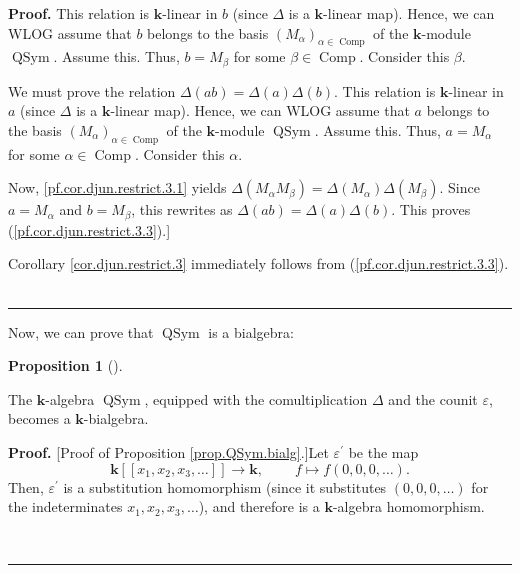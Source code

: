 \documentclass[numbers=enddot,12pt,final,onecolumn,notitlepage,abstracton]{scrartcl}
\theoremstyle{definition}
\newtheorem{prop}[theo]{Proposition}
\newenvironment{proposition}[1][]
{\begin{prop}[#1]\begin{leftbar}}
{\end{leftbar}\end{prop}}
\newenvironment{proof}[1][Proof]{\noindent\textbf{#1.} }{\ \rule{0.5em}{0.5em}}
\newenvironment{verlong}{}{}
\begin{document}
\begin{verlong}
\begin{footnotesize}
\begin{proof}
This relation is $\mathbf{k}$-linear in $b$ (since $\Delta$ is a $\mathbf{k}%
$-linear map). Hence, we can WLOG assume that $b$ belongs to the basis
$\left(  M_{\alpha}\right)  _{\alpha\in\operatorname*{Comp}}$ of the
$\mathbf{k}$-module $\operatorname*{QSym}$. Assume this. Thus, $b=M_{\beta}$
for some $\beta\in\operatorname*{Comp}$. Consider this $\beta$.

We must prove the relation $\Delta\left(  ab\right)  =\Delta\left(  a\right)
\Delta\left(  b\right)  $. This relation is $\mathbf{k}$-linear in $a$ (since
$\Delta$ is a $\mathbf{k}$-linear map). Hence, we can WLOG assume that $a$
belongs to the basis $\left(  M_{\alpha}\right)  _{\alpha\in
\operatorname*{Comp}}$ of the $\mathbf{k}$-module $\operatorname*{QSym}$.
Assume this. Thus, $a=M_{\alpha}$ for some $\alpha\in\operatorname*{Comp}$.
Consider this $\alpha$.

Now, \eqref{pf.cor.djun.restrict.3.1} yields $\Delta\left(  M_{\alpha}%
M_{\beta}\right)  =\Delta\left(  M_{\alpha}\right)  \Delta\left(  M_{\beta
}\right)  $. Since $a = M_{\alpha}$ and $b = M_{\beta}$, this rewrites as
$\Delta\left(  ab \right)  = \Delta\left(  a \right)  \Delta\left(  b \right)
$. This proves (\ref{pf.cor.djun.restrict.3.3}).]

Corollary \ref{cor.djun.restrict.3} immediately follows from
(\ref{pf.cor.djun.restrict.3.3}).
\end{proof}

Now, we can prove that $\operatorname*{QSym}$ is a bialgebra:

\begin{proposition}
\label{prop.QSym.bialg}The $\mathbf{k}$-algebra $\operatorname*{QSym}$,
equipped with the comultiplication $\Delta$ and the counit $\varepsilon$,
becomes a $\mathbf{k}$-bialgebra.
\end{proposition}

\begin{proof}
[Proof of Proposition \ref{prop.QSym.bialg}.]Let $\varepsilon^{\prime}$ be the
map%
\[
\mathbf{k}\left[  \left[  x_{1},x_{2},x_{3},\ldots\right]  \right]
\rightarrow\mathbf{k},\ \ \ \ \ \ \ \ \ \ f\mapsto f\left(  0,0,0,\ldots
\right)  .
\]
Then, $\varepsilon^{\prime}$ is a substitution homomorphism (since it
substitutes $\left(  0,0,0,\ldots\right)  $ for the indeterminates
$x_{1},x_{2},x_{3},\ldots$), and therefore is a $\mathbf{k}$-algebra homomorphism.


\end{proof}
\end{footnotesize}
\end{verlong}
\end{document}
